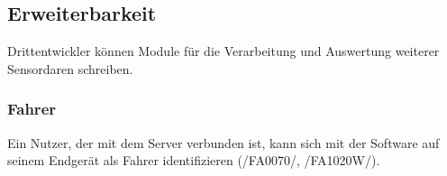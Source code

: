 \documentclass[pflichtenheft.tex]{subfiles}
\begin{document}
\subsection{\mkfa Erweiterbarkeit} Drittentwickler können Module für die Verarbeitung und Auswertung weiterer Sensordaren schreiben.

\subsubsection{\mkfaw Fahrer} Ein Nutzer, der mit dem Server verbunden ist, kann sich mit der Software auf seinem Endgerät als Fahrer identifizieren (/FA0070/, /FA1020W/).
\end{document}

